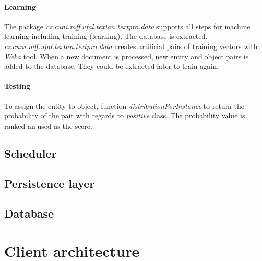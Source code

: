 \paragraph{Learning}
The package \emph{cz.cuni.mff.ufal.textan.textpro.data} supports all steps for machine
learning including training (learning). The database is extracted. 
\emph{cz.cuni.mff.ufal.textan.textpro.data} creates 
artificial pairs of training vectors with \textit{Weka} tool. When a new document is
processed, new entity and object pairs is added to the database. They could be extracted
later to train again.

\paragraph{Testing}
To assign the entity to object, function \emph{distributionForInstance} to return the 
probability of the pair with regards to \emph{positive} class. The probability value 
is ranked an used as the score.


\subsection{Scheduler}


\subsection{Persistence layer}




\subsection{Database}



\section{Client architecture}

